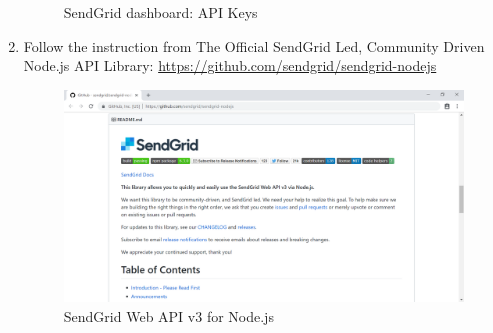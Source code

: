 \begin{enumerate}
\begin{center}
\begin{figure}[H]
	      		\caption{SendGrid dashboard: API Keys}
	      	\end{figure}
	      \end{center}
	\item Follow the instruction from The Official SendGrid Led, Community Driven Node.js API Library: \href{https://github.com/sendgrid/sendgrid-nodejs}{https://github.com/sendgrid/sendgrid-nodejs}
	      \begin{center}
	      	\begin{figure}[H]
	      		\centering
	      		\includegraphics[width=0.6\columnwidth]{images/appendixA/SendGrid-Nodejs-Library.PNG}
	      		\caption{SendGrid Web API v3 for Node.js}
	      	\end{figure}
	      \end{center}
\end{enumerate}

